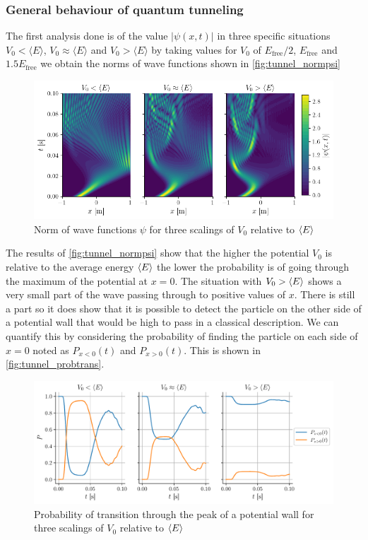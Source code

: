 \subsubsection{General behaviour of quantum tunneling}
The first analysis done is of the value $|\psi(x,t)|$ in three specific situations $V_0<\langle E \rangle$, $V_0\approx\langle E \rangle$ and $V_0>\langle E \rangle$ by taking values for $V_0$ of $E_\mathrm{free}/2$, $E_\mathrm{free}$ and $1.5 E_\mathrm{free}$ we obtain the norms of wave functions shown in \autoref{fig:tunnel_normpsi}
\begin{figure}[h]
    \centering
    \includegraphics[width = \linewidth]{figures/tunnel_normpsi.png}
    \caption{Norm of wave functions $\psi$ for three scalings of $V_0$ relative to $\langle E \rangle$}
    \label{fig:tunnel_normpsi}
\end{figure}

The results of \autoref{fig:tunnel_normpsi} show that the higher the potential $V_0$ is relative to the average energy $\langle E \rangle$ the lower the probability is of going through the maximum of the potential at $x=0$. The situation with $V_0 > \langle E \rangle$ shows a very small part of the wave passing through to positive values of $x$. There is still a part so it does show that it is possible to detect the particle on the other side of a potential wall that would be high to pass in a classical description. We can quantify this by considering the probability of finding the particle on each side of $x=0$ noted as $P_{x<0}(t)$ and $P_{x>0}(t)$. This is shown in \autoref{fig:tunnel_probtrans}.
\begin{figure}[h]
    \centering
    \includegraphics[width=\linewidth]{figures/tunnel_probtrans.pdf}
    \caption{Probability of transition through the peak of a potential wall for three scalings of $V_0$ relative to $\langle E \rangle$}
    \label{fig:tunnel_probtrans}
\end{figure}

